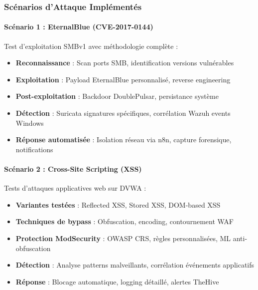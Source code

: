 \subsubsection{Scénarios d'Attaque Implémentés}

\paragraph{Scénario 1 : EternalBlue (CVE-2017-0144)}
Test d'exploitation SMBv1 avec méthodologie complète :
\begin{itemize}
    \item \textbf{Reconnaissance} : Scan ports SMB, identification versions vulnérables
    \item \textbf{Exploitation} : Payload EternalBlue personnalisé, reverse engineering
    \item \textbf{Post-exploitation} : Backdoor DoublePulsar, persistance système
    \item \textbf{Détection} : Suricata signatures spécifiques, corrélation Wazuh events Windows
    \item \textbf{Réponse automatisée} : Isolation réseau via n8n, capture forensique, notifications
\end{itemize}

\paragraph{Scénario 2 : Cross-Site Scripting (XSS)}
Tests d'attaques applicatives web sur DVWA :
\begin{itemize}
    \item \textbf{Variantes testées} : Reflected XSS, Stored XSS, DOM-based XSS
    \item \textbf{Techniques de bypass} : Obfuscation, encoding, contournement WAF
    \item \textbf{Protection ModSecurity} : OWASP CRS, règles personnalisées, ML anti-obfuscation
    \item \textbf{Détection} : Analyse patterns malveillants, corrélation événements applicatifs
    \item \textbf{Réponse} : Blocage automatique, logging détaillé, alertes TheHive
\end{itemize}

